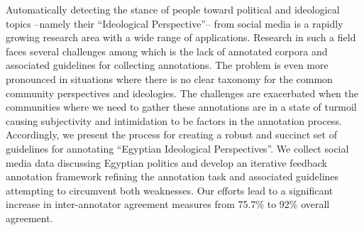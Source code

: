 Automatically detecting the stance of people toward political and ideological topics --namely their ``Ideological Perspective''-- from social media is a rapidly growing research area with a wide range of applications. Research in such a field faces several challenges among which is the lack of annotated corpora and associated guidelines for collecting annotations. The problem is even more pronounced in situations where there is no clear taxonomy for the common community perspectives and ideologies. The challenges are exacerbated when the communities where we need to gather these annotations are in a state of turmoil causing subjectivity and intimidation to be factors in the annotation process. Accordingly, we present the process for creating a robust and succinct set of guidelines for annotating ``Egyptian Ideological Perspectives''. We collect social media data discussing Egyptian politics and develop an iterative feedback  annotation framework refining the annotation task and associated guidelines attempting to circumvent both weaknesses. Our efforts lead to a significant increase in inter-annotator agreement measures from 75.7\% to 92\% overall agreement.
